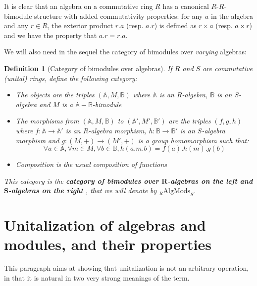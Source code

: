 \documentclass[a4paper,fleqn]{cas-sc}
\newtheorem{dfnt}{Definition}%
\newcommand{\bA}{\mathbb{A}}
\newcommand{\bB}{\mathbb{B}}
\newcommand{\amod}{\mathrm{AlgMods}}
\begin{document}
It is clear that an algebra on a commutative ring $R$ has a canonical $R$-$R$-bimodule structure with added commutativity properties: for any $a$ in the algebra and any $r \in R$, the exterior product $r . a$ (resp. $a.r$) is defined as $r \times a$ (resp. $a \times r$) and we have the property that $a.r = r.a$.

We will also need in the sequel the category of bimodules over \textit{varying} algebras: 

\begin{dfnt}[Category of bimodules over algebras]
If $R$ and $S$ are commutative (unital) rings, define the following category:
\begin{itemize}
    \item The objects are the triples $(\bA, M, \bB)$ where $\bA$ is an $R$-algebra, $\bB$ is an $S$-algebra and $M$ is a $\bA-\bB$-bimodule
    \item The morphisms from $(\bA, M, \bB)$ to $(\bA', M', \bB')$ are the triples $(f,g,h)$ where $f : \bA \to \bA'$ is an $R$-algebra morphism,
    $h : \bB \to \bB'$ is an $S$-algebra morphism and $g : (M, +) \to (M', +)$ is a group homomorphism such that:
    \[\forall a \in \bA, \forall m \in M, \forall b \in \bB,
    h(a.m.b) = f(a).h(m).g(b)\]
    \item Composition is the usual composition of functions
\end{itemize}
This category is the \textbf{category of bimodules over $\mathbf{R}$-algebras on the left and $\mathbf{S}$-algebras on the right}%
, that we will denote by $_R \amod _S$. %
\end{dfnt}

\section{Unitalization of algebras and modules, and their properties}

\label{sec:unitalization}

This paragraph aims at showing that unitalization is not an arbitrary operation, in that it is natural in two very strong meanings of the term.
\end{document}
